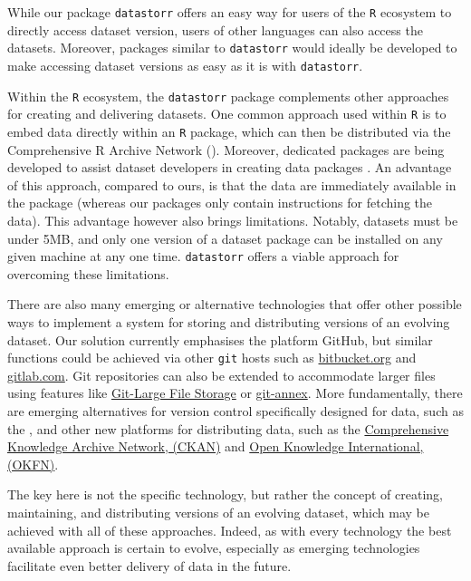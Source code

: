 \documentclass[a4paper,num-refs]{oup-contemporary}
\begin{document}
While our package \texttt{datastorr} offers an easy way for users of the \texttt{R} ecosystem to directly access dataset version, users of other languages can also access the datasets. Moreover, packages similar to \texttt{datastorr} would ideally be developed to make accessing dataset versions as easy as it is with \texttt{datastorr}.

Within the \texttt{R} ecosystem, the \texttt{datastorr} package complements other approaches for creating and delivering datasets. One common approach used within \texttt{R} is to embed data directly within an \texttt{R} package, which can then be distributed via the Comprehensive R Archive Network (). Moreover, dedicated packages are being developed to assist dataset developers in creating data packages \cite{Finak-2018}. An advantage of this approach, compared to ours, is that the data are immediately available in the package (whereas our packages only contain instructions for fetching the data). This advantage however also brings limitations. Notably, datasets must be under 5MB, and only one version of a dataset package can be installed on any given machine at any one time.  \texttt{datastorr} offers a viable approach for overcoming these limitations.

There are also many emerging or alternative technologies that offer other possible ways to implement a system for storing and distributing versions of an evolving dataset. Our solution currently emphasises the platform GitHub, but similar functions could be achieved via other \texttt{git} hosts such as \href{http://bitbucket.org}{bitbucket.org} and \href{http://gitlab.com}{gitlab.com}. Git repositories can also be extended to accommodate larger files using  features like \href{https://git-lfs.github.com/}{Git-Large File Storage} or \href{http://git-annex.branchable.com/}{git-annex}. More fundamentally, there are  emerging alternatives for version control specifically designed for data, such as the , and other new platforms for distributing data, such as the \href{https://en.wikipedia.org/wiki/CKAN}{Comprehensive Knowledge Archive Network, (CKAN)} and \href{https://okfn.org/}{Open Knowledge International, (OKFN)}. 

The key here is not the specific technology, but rather the concept of creating, maintaining, and distributing versions of an evolving dataset, which may be achieved with all of these approaches. Indeed, as with every technology the best available approach is certain to evolve, especially as emerging technologies facilitate even better delivery of data in the future.
\end{document}

